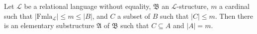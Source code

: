 Let $\mathcal{L}$ be a relational language without equality, $\mathfrak{B}$ an $\mathcal{L}$-structure, $m$ a cardinal such that $|\text{Fmla}_{\mathcal{L}}| \leq m \leq |B|$, and $C$ a subset of $B$ such that $|C| \leq m$. Then there is an elementary substructure $\mathfrak{A}$ of $\mathfrak{B}$ such that $C \subseteq A$ and $|A| = m$.
